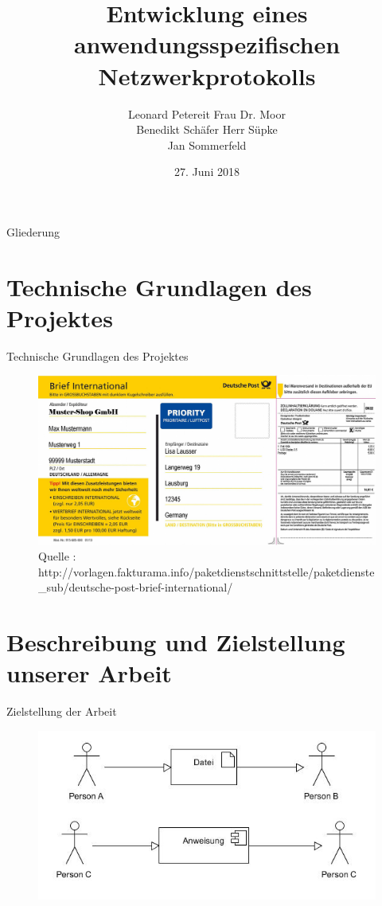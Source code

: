 \documentclass{beamer}
\title[]{Entwicklung eines anwendungsspezifischen Netzwerkprotokolls}
\author{Leonard Petereit\hfill \hspace{0.5cm} Frau Dr. Moor\\ Benedikt Schäfer\hfill \hspace{1cm} Herr Süpke \\ Jan Sommerfeld \hspace{4.25cm} }
\institute{Albert-Schweitzer Gymnasium Erfurt - Spezialschulteil}
\date{27. Juni 2018}
\begin{document}
\begin{frame}
	
  \titlepage
\end{frame}

\begin{frame}{Gliederung}

  \tableofcontents
\end{frame}



\section{Technische Grundlagen des Projektes}

\begin{frame}{Technische Grundlagen des Projektes}
\begin{figure}
\includegraphics{brief_international.jpg}
\caption{Quelle : http://vorlagen.fakturama.info/paketdienstschnittstelle/paketdienste_sub/deutsche-post-brief-international/}
\end{figure}
\end{frame}

\section{Beschreibung und Zielstellung unserer Arbeit}

\begin{frame}{Zielstellung der Arbeit}
\begin{figure}
\includegraphics[width=\textwidth]{anw.jpg}
\end{figure}
\end{frame}
\end{document}
